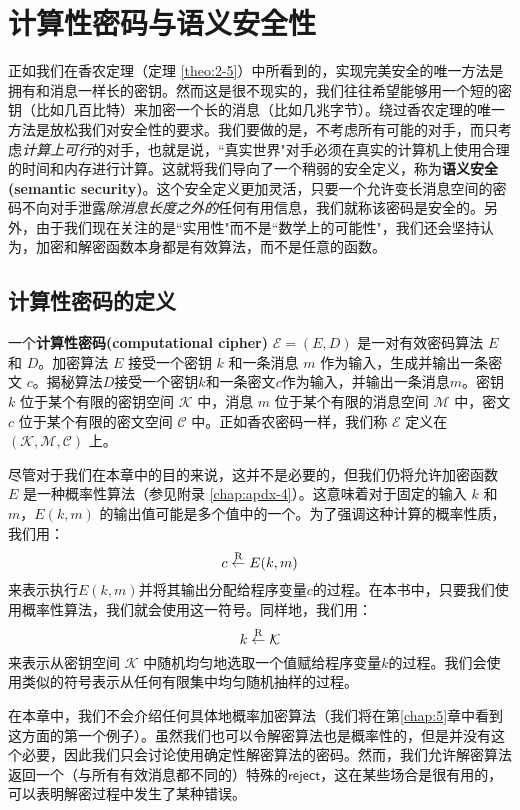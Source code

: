 \section{计算性密码与语义安全性}

正如我们在香农定理（定理 \ref{theo:2-5}）中所看到的，实现完美安全的唯一方法是拥有和消息一样长的密钥。然而这是很不现实的，我们往往希望能够用一个短的密钥（比如几百比特）来加密一个长的消息（比如几兆字节）。绕过香农定理的唯一方法是放松我们对安全性的要求。我们要做的是，不考虑所有可能的对手，而只考虑\emph{计算上可行}的对手，也就是说，``真实世界"对手必须在真实的计算机上使用合理的时间和内存进行计算。这就将我们导向了一个稍弱的安全定义，称为\textbf{语义安全(semantic security)}。这个安全定义更加灵活，只要一个允许变长消息空间的密码不向对手泄露\emph{除消息长度之外的}任何有用信息，我们就称该密码是安全的。另外，由于我们现在关注的是``实用性"而不是``数学上的可能性"，我们还会坚持认为，加密和解密函数本身都是有效算法，而不是任意的函数。

\subsection{计算性密码的定义}\label{subsec:2-2-1}

一个\textbf{计算性密码(computational cipher)} $\mathcal{E}=(E,D)$ 是一对有效密码算法 $E$ 和 $D$。加密算法 $E$ 接受一个密钥 $k$ 和一条消息 $m$ 作为输入，生成并输出一条密文 $c$。揭秘算法$D$接受一个密钥$k$和一条密文$c$作为输入，并输出一条消息$m$。密钥 $k$ 位于某个有限的密钥空间 $\mathcal{K}$ 中，消息 $m$ 位于某个有限的消息空间 $\mathcal{M}$ 中，密文 $c$ 位于某个有限的密文空间 $\mathcal{C}$ 中。正如香农密码一样，我们称 $\mathcal{E}$ 定义在 $(\mathcal{K},\mathcal{M},\mathcal{C})$ 上。

尽管对于我们在本章中的目的来说，这并不是必要的，但我们仍将允许加密函数 $E$ 是一种概率性算法（参见附录 \ref{chap:apdx-4}）。这意味着对于固定的输入 $k$ 和 $m$，$E(k,m)$ 的输出值可能是多个值中的一个。为了强调这种计算的概率性质，我们用：
$$
c\overset{\rm R}\leftarrow E(k,m)
$$
来表示执行$E(k,m)$并将其输出分配给程序变量$c$的过程。在本书中，只要我们使用概率性算法，我们就会使用这一符号。同样地，我们用：
$$
k\overset{\rm R}\leftarrow\mathcal{K}
$$
来表示从密钥空间 $\mathcal{K}$ 中随机均匀地选取一个值赋给程序变量$k$的过程。我们会使用类似的符号表示从任何有限集中均匀随机抽样的过程。

在本章中，我们不会介绍任何具体地概率加密算法（我们将在第\ref{chap:5}章中看到这方面的第一个例子）。虽然我们也可以令解密算法也是概率性的，但是并没有这个必要，因此我们只会讨论使用确定性解密算法的密码。然而，我们允许解密算法返回一个（与所有有效消息都不同的）特殊的$\mathsf{reject}$，这在某些场合是很有用的，可以表明解密过程中发生了某种错误。

